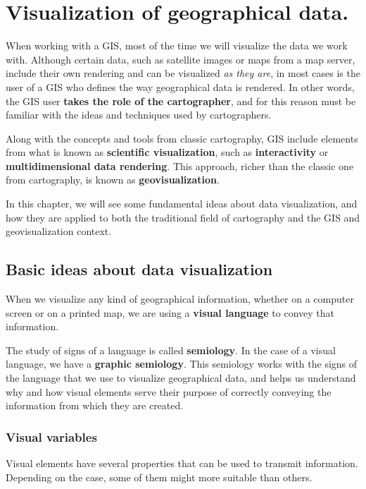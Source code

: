 \chapter{Visualization of geographical data.}


\pagestyle{fancy}

When working with a GIS, most of the time we will visualize the data we work with. Although certain data, such as satellite images or maps from a map server, include their own rendering and can be visualized \emph{as they are}, in most cases is the user of a GIS who defines the way geographical data is rendered. In other words, the GIS user \textbf{takes the role of the cartographer}, and for this reason must be familiar with the ideas and techniques used by cartographers.

Along with the concepts and tools from classic cartography, GIS include elements from what is known as \textbf{scientific visualization}, such as \textbf{interactivity} or \textbf{multidimensional data rendering}. This approach, richer than the classic one from cartography, is known as \textbf{geovisualization}.

In this chapter, we will see some fundamental ideas about data visualization, and how they are applied to both the traditional field of cartography and the GIS and geovisualization context.

\section{Basic ideas about data visualization}

When we visualize any kind of geographical information, whether on a computer screen or on a printed map, we are using a \textbf{visual language} to convey that information. 

The study of signs of a language is called \textbf{semiology}. In the case of a visual language, we have a \textbf{graphic semiology}. This semiology works with the signs of the language that we use to visualize geographical data, and helps us understand why and how visual elements serve their purpose of correctly conveying the information from which they are created.

\subsection{Visual variables}

Visual elements have several properties that can be used to transmit information. Depending on the case, some of them might more suitable than others.


